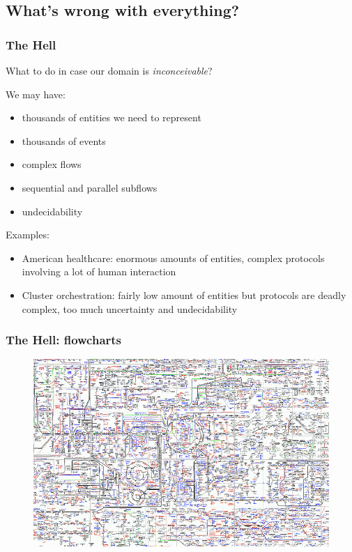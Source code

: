 \documentclass{beamer}
\begin{document}
\subsection{What's wrong with everything?}

\begin{frame}
    \frametitle{The Hell}
    What to do in case our domain is \textit{inconceivable}?

    We may have: 
    \begin{itemize}
        \item thousands of entities we need to represent
        \item thousands of events
        \item complex flows 
        \item sequential and parallel subflows
        \item undecidability
    \end{itemize}

    Examples:
    \begin{itemize}
        \item American healthcare: enormous amounts of entities, complex protocols involving a lot of human interaction
        \item Cluster orchestration: fairly low amount of entities but protocols are deadly complex, too much uncertainty and undecidability
    \end{itemize}
\end{frame}

\begin{frame}
    \frametitle{The Hell: flowcharts}
    
    \begin{figure}
        \includegraphics[width=\textwidth]{media/flowshit}
    \end{figure}
\end{frame}
\end{document}
